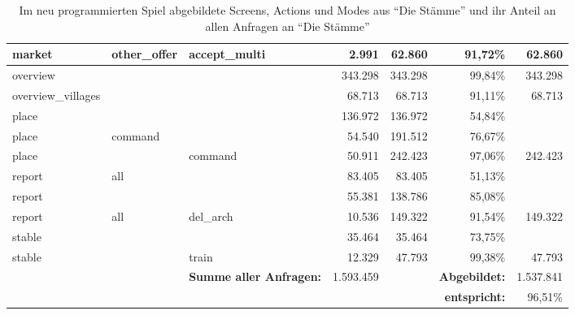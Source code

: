 \documentclass[10pt]{scrartcl}
\begin{document}
\begin{landscape}
\begin{table}[htbp]
\begin{tabular}{|l|l|l|r|r|r|l|}
market & other\_offer & accept\_multi & 2.991 & 62.860 & 91,72\% & \multicolumn{1}{r|}{62.860} \\ \hline
overview &  &  & 343.298 & 343.298 & 99,84\% & \multicolumn{1}{r|}{343.298} \\ \hline
overview\_villages &  &  & 68.713 & 68.713 & 91,11\% & \multicolumn{1}{r|}{68.713} \\ \hline
place &  &  & 136.972 & 136.972 & 54,84\% &  \\ \hline
place & command &  & 54.540 & 191.512 & 76,67\% &  \\ \hline
place &  & command & 50.911 & 242.423 & 97,06\% & \multicolumn{1}{r|}{242.423} \\ \hline
report & all &  & 83.405 & 83.405 & 51,13\% &  \\ \hline
report &  &  & 55.381 & 138.786 & 85,08\% &  \\ \hline
report & all & del\_arch & 10.536 & 149.322 & 91,54\% & \multicolumn{1}{r|}{149.322} \\ \hline
stable &  &  & 35.464 & 35.464 & 73,75\% &  \\ \hline
stable &  & train & 12.329 & 47.793 & 99,38\% & \multicolumn{1}{r|}{47.793} \\ \hline

 &  & \textbf{Summe aller Anfragen:} & 1.593.459 & \multicolumn{1}{l|}{} & \textbf{Abgebildet:} & \multicolumn{1}{r|}{1.537.841} \\ \hline
 &  &  & \multicolumn{1}{l|}{} & \multicolumn{1}{l|}{} & \textbf{entspricht:} & \multicolumn{1}{r|}{96,51\%} \\ \hline
\end{tabular}
\caption{Im neu programmierten Spiel abgebildete Screens, Actions und Modes aus ``Die Stämme'' und ihr Anteil an allen Anfragen an ``Die Stämme''}
\label{table:game_analysis_screens_modes_actions}
\end{table}
\end{landscape}
  
\end{document}
